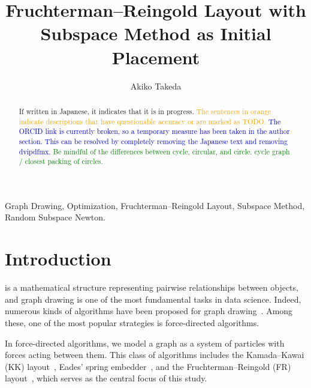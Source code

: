 \documentclass[dvipdfmx,lettersize,journal]{IEEEtran}
\newcommand{\blue}[1]{\textcolor{blue}{#1}}
\newcommand{\green}[1]{\textcolor{green}{#1}}
\newcommand{\orange}[1]{\textcolor{orange}{#1}}
\begin{document}

\title{Fruchterman--Reingold Layout with\\Subspace Method as Initial Placement}
\author{
  Akiko Takeda
}
\maketitle

\begin{abstract}
  If written in Japanese, it indicates that it is in progress.
  \orange{The sentences in orange indicate descriptions that have questionable accuracy or are marked as TODO.}
  \blue{The ORCID link is currently broken, so a temporary measure has been taken in the author section. This can be resolved by completely removing the Japanese text and removing dvipdfmx.}
  \green{
    Be mindful of the differences between cycle, circular, and circle. cycle graph / closest packing of circles.}
  \lipsum[1]
\end{abstract}

\begin{IEEEkeywords}
  Graph Drawing, Optimization, Fruchterman--Reingold Layout, Subspace Method, Random Subspace Newton.
\end{IEEEkeywords}

\section{Introduction}\label{sec:introduction}

 is a mathematical structure representing pairwise relationships between objects, and graph drawing is one of the most fundamental tasks in data science. Indeed, numerous kinds of algorithms have been proposed for graph drawing~\cite{tutteHowDrawGraph1963,chrobakLineartimeAlgorithmDrawing1995,sugiyamaMethodsVisualUnderstanding1981,ghassemitoosiSimulatedAnnealingPreProcessing2016}.
Among these, one of the most popular strategies is force-directed algorithms.

In force-directed algorithms, we model a graph as a system of particles with forces acting between them.
This class of algorithms includes the Kamada--Kawai (KK) layout~\cite{kamadaAlgorithmDrawingGeneral1989},
Eades' spring embedder~\cite{eades1984heuristic}, and the Fruchterman--Reingold (FR) layout~\cite{fruchtermanGraphDrawingForcedirected1991,kobourovSpringEmbeddersForce2012}, which serves as the central focus of this study.
\end{document}

